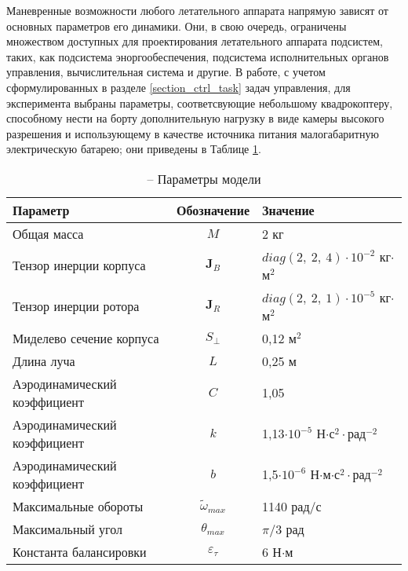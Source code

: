 Маневренные возможности любого летательного аппарата напрямую зависят от основных параметров его динамики.
Они, в свою очередь, ограничены множеством доступных для проектирования летательного аппарата подсистем, таких, как подсистема эноргообеспечения, подсистема исполнительных органов управления, вычислительная система и другие. 
В работе, с учетом сформулированных в разделе \ref{section_ctrl_task} задач управления, для эксперимента выбраны параметры, соответсвующие небольшому квадрокоптеру, способному нести на борту дополнительную нагрузку в виде камеры высокого разрешения и использующему в качестве источника питания малогабаритную электрическую батарею; они приведены в Таблице \ref{tb:params_table}.
\begin{table}[h!]
	\centering
	\caption{ -- Параметры модели}\label{tb:params_table} 
	\begin{tabular}{lcl}
		\hline
		Параметр & Обозначение & Значение  \\\hline
		Общая масса & $M$ & 2 кг  \\
		Тензор инерции корпуса & $\bm J_B$ & $diag(2,\ 2,\ 4)\cdot{10^{-2}}$ кг$\cdot$м$^2$  \\
		Тензор инерции ротора & $\bm J_R$ & $diag(2,\ 2,\ 1)\cdot{10^{-5}}$ кг$\cdot$м$^2$  \\
		Миделево сечение корпуса & $S_{\perp}$ & 0,12 м$^2$ \\
		Длина луча & $L$ & 0,25 м \\
		Аэродинамический коэффициент & $C$ & 1,05\\
		Аэродинамический коэффициент & $k$ & 1,13$\cdot 10^{-5}$ Н$\cdot$с$^2\cdot$рад$^{-2}$ \\		
		Аэродинамический коэффициент & $b$ & 1,5$\cdot 10^{-6}$ Н$\cdot$м$\cdot$с$^2\cdot$рад$^{-2}$ \\		
		Максимальные обороты & $\tilde \omega_{max}$ & 1140 рад/с \\		
		Максимальный угол & $\theta_{max}$ & ${\pi}/{3}$ рад \\
		Константа балансировки & $\varepsilon_\tau$ &6 Н$\cdot$м \\
		\hline
	\end{tabular}
\end{table}

